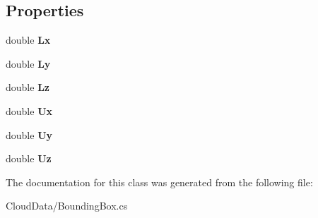 \subsection*{Properties}
\begin{DoxyCompactItemize}
\item 
\mbox{\label{class_cloud_data_1_1_bounding_box_a5b1c5fb7f1aa969b229ddc3b90eebd4f}} 
double {\bfseries Lx}
\item 
\mbox{\label{class_cloud_data_1_1_bounding_box_a8c6bc25680269352356dd8dfbdba6d56}} 
double {\bfseries Ly}
\item 
\mbox{\label{class_cloud_data_1_1_bounding_box_a419d5665cf475e9f21747d651162e7e4}} 
double {\bfseries Lz}
\item 
\mbox{\label{class_cloud_data_1_1_bounding_box_aebeb49a340501e573d02d828c4457560}} 
double {\bfseries Ux}
\item 
\mbox{\label{class_cloud_data_1_1_bounding_box_a6949e58d591077d9989177883bbd46ea}} 
double {\bfseries Uy}
\item 
\mbox{\label{class_cloud_data_1_1_bounding_box_a5d242c32897b18aa60d6ce3659278ee6}} 
double {\bfseries Uz}
\end{DoxyCompactItemize}


The documentation for this class was generated from the following file\+:\begin{DoxyCompactItemize}
\item 
Cloud\+Data/Bounding\+Box.\+cs\end{DoxyCompactItemize}
